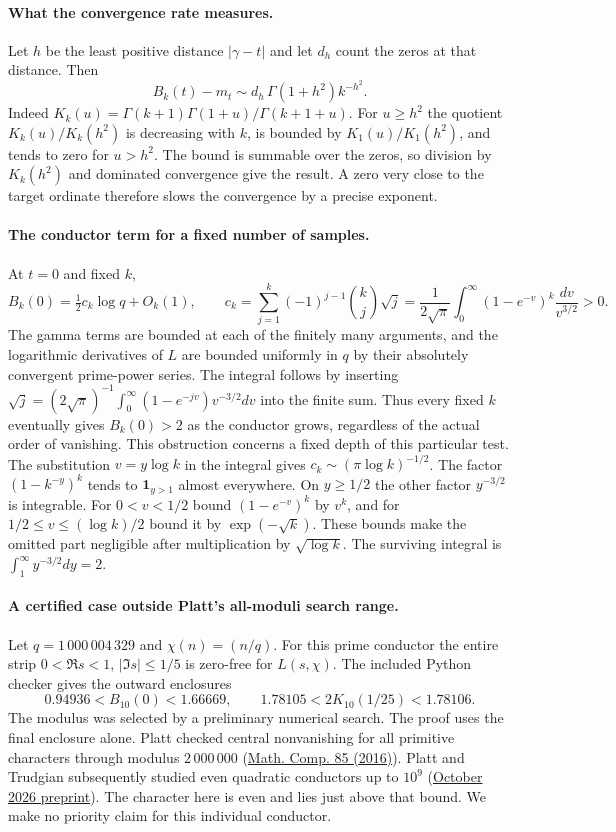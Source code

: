 \paragraph{What the convergence rate measures.}
Let $h$ be the least positive distance $|\gamma-t|$ and let $d_h$ count
the zeros at that distance. Then
\[
  B_k(t)-m_t\sim d_h\,\Gamma(1+h^2)k^{-h^2}.
\]
Indeed $K_k(u)=\Gamma(k+1)\Gamma(1+u)/\Gamma(k+1+u)$.
For $u\ge h^2$ the quotient $K_k(u)/K_k(h^2)$ is decreasing with $k$,
is bounded by $K_1(u)/K_1(h^2)$, and tends to zero for $u>h^2$.
The bound is summable over the zeros, so division by $K_k(h^2)$ and
dominated convergence give the result. A zero very close to the target
ordinate therefore slows the convergence by a precise exponent.

\paragraph{The conductor term for a fixed number of samples.}
At $t=0$ and fixed $k$,
\[
 B_k(0)=\tfrac12 c_k\log q+O_k(1),\qquad
 c_k=\sum_{j=1}^k(-1)^{j-1}\binom{k}{j}\sqrt j
 =\frac1{2\sqrt\pi}\int_0^\infty(1-e^{-v})^k\frac{dv}{v^{3/2}}>0 .
\]
The gamma terms are bounded at each of the finitely many arguments, and
the logarithmic derivatives of $L$ are bounded uniformly in $q$ by their
absolutely convergent prime-power series. The integral follows by inserting
$\sqrt j=(2\sqrt\pi)^{-1}\int_0^\infty(1-e^{-jv})v^{-3/2}dv$
into the finite sum. Thus every fixed $k$ eventually gives $B_k(0)>2$
as the conductor grows, regardless of the actual order of vanishing.
This obstruction concerns a fixed depth of this particular test.
The substitution $v=y\log k$ in the integral gives $c_k\sim(\pi\log k)^{-1/2}$.
The factor $(1-k^{-y})^k$ tends to $\mathbf1_{y>1}$ almost everywhere.
On $y\ge1/2$ the other factor $y^{-3/2}$ is integrable. For
$0<v<1/2$ bound $(1-e^{-v})^k$ by $v^k$, and for
$1/2\le v\le (\log k)/2$ bound it by $\exp(-\sqrt k)$.
These bounds make the omitted part negligible after multiplication by
$\sqrt{\log k}$. The surviving integral is $\int_1^\infty y^{-3/2}dy=2$.

\paragraph{A certified case outside Platt's all-moduli search range.}
Let $q=1\,000\,004\,329$ and $\chi(n)=(n/q)$. For this prime conductor
the entire strip $0<\Re s<1$, $|\Im s|\le1/5$ is zero-free for
$L(s,\chi)$. The included Python checker gives the outward enclosures
\[
   0.94936 < B_{10}(0)<1.66669,\qquad
   1.78105 < 2K_{10}(1/25) < 1.78106 .
\]
The modulus was selected by a preliminary numerical search. The proof
uses the final enclosure alone. Platt checked central nonvanishing for
all primitive characters through modulus $2\,000\,000$
(\href{https://doi.org/10.1090/mcom/3077}{Math. Comp. 85 (2016)}).
Platt and Trudgian subsequently studied even quadratic conductors up to $10^9$
(\href{https://arxiv.org/abs/2610.29018}{October 2026 preprint}).
The character here is even and lies just above that bound. We make no
priority claim for this individual conductor.

